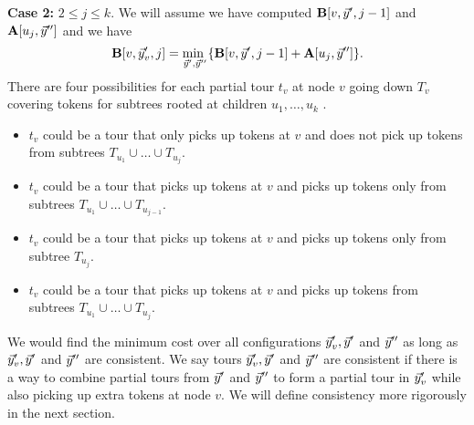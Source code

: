 \documentclass[twoside,leqno]{article}
\newcommand{\mi}[1]{\underset{#1}{\text{min }}}
\begin{document}
\textbf{Case 2:} $2 \le j \le k$. We will assume we have computed $\textbf{B}[v, \vec{y}', j - 1]$ and $\textbf{A}[u_{j}, \vec{y}'']$ and we have 
$$\bbold[v, \yvec_v', j] = \mi{\yvec', \yvec''} \{\bbold[v, \yvec', j - 1] + \abold[u_{j}, \yvec''] \}.$$
There are four possibilities for each partial tour $t_v$ at node $v$ going down $T_v$ covering tokens for subtrees rooted at children $u_1, \ldots, u_k$ . 
\begin{itemize}
    \item $t_v$ could be a tour that only picks up tokens at $v$ and does not pick up tokens from subtrees $T_{u_1} \cup \ldots \cup T_{u_{j}}$.
    \item $t_v$ could be a tour that picks up tokens at $v$ and picks up tokens only from subtrees $T_{u_1} \cup \ldots \cup T_{u_{j-1}}$. 
    \item $t_v$ could be a tour that picks up tokens at $v$ and picks up tokens only from subtree $T_{u_{j}}$.
    \item $t_v$ could be a tour that picks up tokens at $v$ and picks up tokens from subtrees $T_{u_1} \cup \ldots \cup T_{u_{j}}$. 
\end{itemize}
We would find the minimum cost over all configurations $\vec{y}_v', \vec{y}'$ and $\vec{y}''$ as long as $\vec{y}_v', \vec{y}'$ and $\vec{y}''$ are consistent. We say tours $\vec{y}_v',\vec{y}'$ and $\vec{y}''$ are consistent if there is a way to combine partial tours from $\vec{y}'$ and $\vec{y}''$ to form a partial tour in $\vec{y}_v'$ while also picking up extra tokens at node $v$. We will define consistency more rigorously in the next section. 

\end{document}
